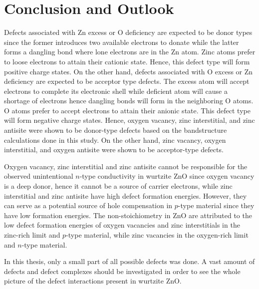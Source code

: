 \chapter{Conclusion and Outlook} \label{chap:conclu}
Defects associated with Zn excess or O deficiency are expected to be donor types since the former introduces two available electrons to donate while the latter forms a dangling bond where lone electrons are in the Zn atom. Zinc atoms prefer to loose electrons to attain their cationic state. Hence, this defect type will form  positive charge states. On the other hand, defects associated with O excess or Zn deficiency are expected to be acceptor type defects. The excess  atom will accept electrons to complete its electronic shell while deficient  atom will cause a shortage of electrons hence  dangling bonds will form in the neighboring O atoms. O atoms prefer to accept electrons to attain their anionic state.
This defect type will form  negative charge states. Hence, oxygen vacancy, zinc interstitial, and zinc antisite were shown to be donor-type defects based on the bandstructure calculations done in this study. On the other hand, zinc vacancy, oxygen interstitial, and oxygen antisite were shown to be acceptor-type defects.

Oxygen vacancy,  zinc interstitial and zinc antisite cannot be responsible for the observed unintentional $n$-type conductivity in wurtzite ZnO since oxygen vacancy is a deep donor, hence it cannot be a source of carrier electrons, while  zinc interstitial and zinc antisite have high defect formation energies. However, they can serve as a potential source of hole compensation in  $p$-type material since they have low formation energies. The non-stoichiometry in ZnO are attributed to the low defect formation energies of oxygen vacancies and  zinc interstitials in the zinc-rich limit and $p$-type material, while zinc vacancies in the oxygen-rich limit and $n$-type material.

In this thesis, only a small part of all possible defects was done.  A vast amount of defects and defect complexes should be investigated in order to see the whole picture of the defect interactions present in wurtzite ZnO. 



